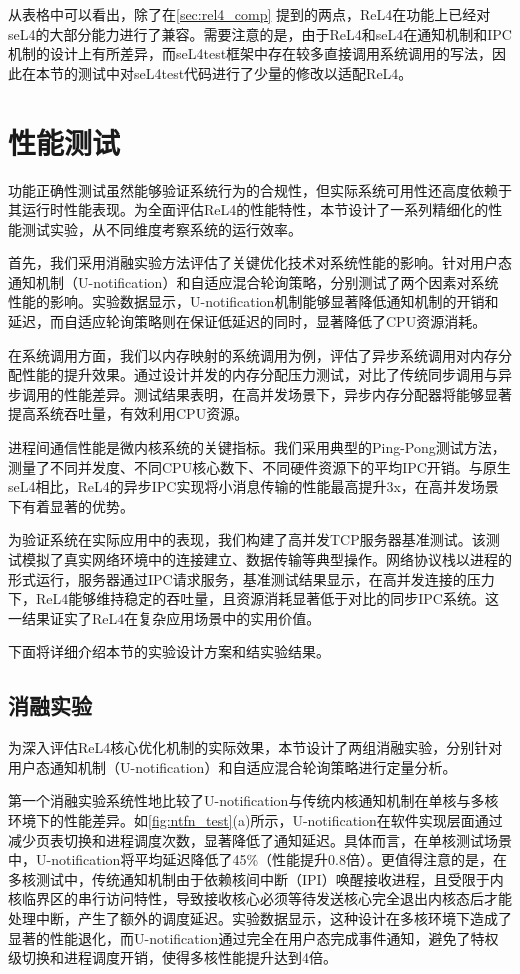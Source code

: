 从表格中可以看出，除了在\ref{sec:rel4_comp} 提到的两点，ReL4在功能上已经对seL4的大部分能力进行了兼容。需要注意的是，由于ReL4和seL4在通知机制和IPC机制的设计上有所差异，而seL4test框架中存在较多直接调用系统调用的写法，因此在本节的测试中对seL4test代码进行了少量的修改以适配ReL4。

\section{性能测试}
功能正确性测试虽然能够验证系统行为的合规性，但实际系统可用性还高度依赖于其运行时性能表现。为全面评估ReL4的性能特性，本节设计了一系列精细化的性能测试实验，从不同维度考察系统的运行效率。

首先，我们采用消融实验方法评估了关键优化技术对系统性能的影响。针对用户态通知机制（U-notification）和自适应混合轮询策略，分别测试了两个因素对系统性能的影响。实验数据显示，U-notification机制能够显著降低通知机制的开销和延迟，而自适应轮询策略则在保证低延迟的同时，显著降低了CPU资源消耗。

在系统调用方面，我们以内存映射的系统调用为例，评估了异步系统调用对内存分配性能的提升效果。通过设计并发的内存分配压力测试，对比了传统同步调用与异步调用的性能差异。测试结果表明，在高并发场景下，异步内存分配器将能够显著提高系统吞吐量，有效利用CPU资源。

进程间通信性能是微内核系统的关键指标。我们采用典型的Ping-Pong测试方法，测量了不同并发度、不同CPU核心数下、不同硬件资源下的平均IPC开销。与原生seL4相比，ReL4的异步IPC实现将小消息传输的性能最高提升3x，在高并发场景下有着显著的优势。

为验证系统在实际应用中的表现，我们构建了高并发TCP服务器基准测试。该测试模拟了真实网络环境中的连接建立、数据传输等典型操作。网络协议栈以进程的形式运行，服务器通过IPC请求服务，基准测试结果显示，在高并发连接的压力下，ReL4能够维持稳定的吞吐量，且资源消耗显著低于对比的同步IPC系统。这一结果证实了ReL4在复杂应用场景中的实用价值。

下面将详细介绍本节的实验设计方案和结实验结果。

\subsection{消融实验}
为深入评估ReL4核心优化机制的实际效果，本节设计了两组消融实验，分别针对用户态通知机制（U-notification）和自适应混合轮询策略进行定量分析。

第一个消融实验系统性地比较了U-notification与传统内核通知机制在单核与多核环境下的性能差异。如\ref{fig:ntfn_test}(a)所示，U-notification在软件实现层面通过减少页表切换和进程调度次数，显著降低了通知延迟。具体而言，在单核测试场景中，U-notification将平均延迟降低了45\%（性能提升0.8倍）。更值得注意的是，在多核测试中，传统通知机制由于依赖核间中断（IPI）唤醒接收进程，且受限于内核临界区的串行访问特性，导致接收核心必须等待发送核心完全退出内核态后才能处理中断，产生了额外的调度延迟。实验数据显示，这种设计在多核环境下造成了显著的性能退化，而U-notification通过完全在用户态完成事件通知，避免了特权级切换和进程调度开销，使得多核性能提升达到4倍。

